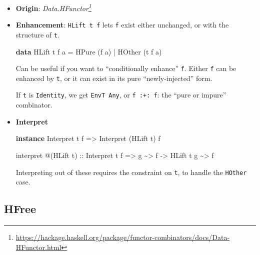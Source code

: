 \documentclass[]{article}
\newenvironment{Shaded}{}{}
\newcommand{\DataTypeTok}[1]{\textcolor[rgb]{0.56,0.13,0.00}{#1}}
\newcommand{\KeywordTok}[1]{\textcolor[rgb]{0.00,0.44,0.13}{\textbf{#1}}}
\newcommand{\NormalTok}[1]{#1}
\newcommand{\OperatorTok}[1]{\textcolor[rgb]{0.40,0.40,0.40}{#1}}
\newcommand{\OtherTok}[1]{\textcolor[rgb]{0.00,0.44,0.13}{#1}}
\renewcommand{\href}[2]{#2\footnote{\url{#1}}}
\begin{document}
\begin{itemize}
\item
  \textbf{Origin}:
  \emph{\href{https://hackage.haskell.org/package/functor-combinators/docs/Data-HFunctor.html}{Data.HFunctor}}
\item
  \textbf{Enhancement}: \texttt{HLift\ t\ f} lets \texttt{f} exist either
  unchanged, or with the structure of \texttt{t}.

\begin{Shaded}
\begin{Highlighting}[]
\KeywordTok{data} \DataTypeTok{HLift}\NormalTok{ t f a}
    \OtherTok{=} \DataTypeTok{HPure}\NormalTok{  (f a)}
    \OperatorTok{|} \DataTypeTok{HOther}\NormalTok{ (t f a)}
\end{Highlighting}
\end{Shaded}

  Can be useful if you want to ``conditionally enhance'' \texttt{f}. Either
  \texttt{f} can be enhanced by \texttt{t}, or it can exist in its pure
  ``newly-injected'' form.

  If \texttt{t} is \texttt{Identity}, we get \texttt{EnvT\ Any}, or
  \texttt{f\ :+:\ f}: the ``pure or impure'' combinator.
\item
  \textbf{Interpret}

\begin{Shaded}
\begin{Highlighting}[]
\KeywordTok{instance} \DataTypeTok{Interpret}\NormalTok{ t f }\OtherTok{=>} \DataTypeTok{Interpret}\NormalTok{ (}\DataTypeTok{HLift}\NormalTok{ t) f}

\NormalTok{interpret }\OperatorTok{@}\NormalTok{(}\DataTypeTok{HLift}\NormalTok{ t)}
\OtherTok{    ::} \DataTypeTok{Interpret}\NormalTok{ t f}
    \OtherTok{=>}\NormalTok{ g }\OperatorTok{\textasciitilde{}>}\NormalTok{ f}
    \OtherTok{{-}>} \DataTypeTok{HLift}\NormalTok{ t g }\OperatorTok{\textasciitilde{}>}\NormalTok{ f}
\end{Highlighting}
\end{Shaded}

  Interpreting out of these requires the constraint on \texttt{t}, to handle the
  \texttt{HOther} case.
\end{itemize}

\hypertarget{hfree}{%
\subsection{HFree}\label{hfree}}
\end{document}
